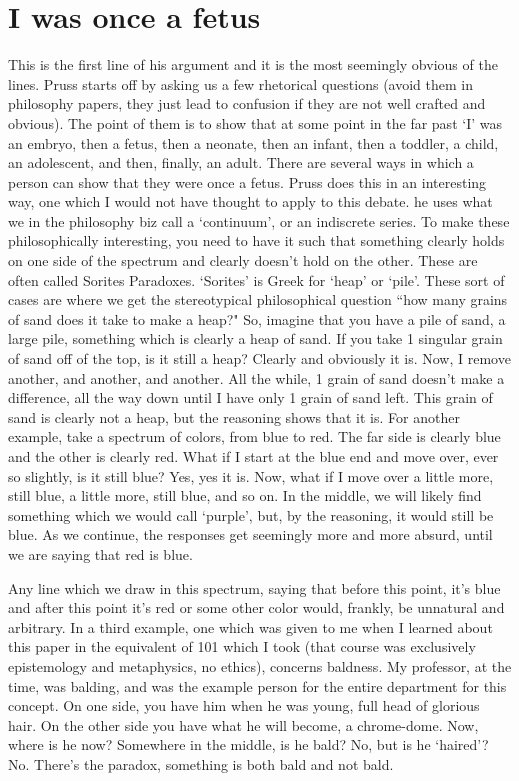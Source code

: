 \section{I was once a fetus}
This is the first line of his argument and it is the most seemingly obvious of the lines. Pruss starts off by asking us a few rhetorical questions (avoid them in philosophy papers, they just lead to confusion if they are not well crafted and obvious). The point of them is to show that at some point in the far past `I' was an embryo, then a fetus, then a neonate, then an infant, then a toddler, a child, an adolescent, and then, finally, an adult. There are several ways in which a person can show that they were once a fetus. Pruss does this in an interesting way, one which I would not have thought to apply to this debate. he uses what we in the philosophy biz call a `continuum', or an indiscrete series. To make these philosophically interesting, you need to have it such that something clearly holds on one side of the spectrum and clearly doesn't hold on the other. These are often called Sorites Paradoxes. `Sorites' is Greek for `heap' or `pile'. These sort of cases are where we get the stereotypical philosophical question ``how many grains of sand does it take to make a heap?" So, imagine that you have a pile of sand, a large pile, something which is clearly a heap of sand. If you take 1 singular grain of sand off of the top, is it still a heap? Clearly and obviously it is. Now, I remove another, and another, and another. All the while, 1 grain of sand doesn't make a difference, all the way down until I have only 1 grain of sand left. This grain of sand is clearly not a heap, but the reasoning shows that it is. For another example, take a spectrum of colors, from blue to red. The far side is clearly blue and the other is clearly red. What if I start at the blue  end and move over, ever so slightly, is it still blue? Yes, yes it is. Now, what if I move over a little more, still blue, a little more, still blue, and so on. In the middle, we will likely find something which we would call `purple', but, by the reasoning, it would still be blue. As we continue, the responses get seemingly more and more absurd, until we are saying that red is blue.   

Any line which we draw in this spectrum, saying that before this point, it's blue and after this point it's red or some other color would, frankly, be unnatural and arbitrary. In a third example, one which was given to me when I learned about this paper in the equivalent of 101 which I took (that course was exclusively epistemology and metaphysics, no ethics), concerns baldness. My professor, at the time, was balding, and was the example person for the entire department for this concept. On one side, you have him when he was young, full head of glorious hair. On the other side you have what he will become, a chrome-dome. Now, where is he now? Somewhere in the middle, is he bald? No, but is he `haired'? No. There's the paradox, something is both bald and not bald. 

